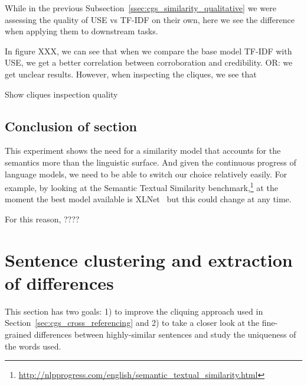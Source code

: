 While in the previous Subsection~\ref{ssec:cgs_similarity_qualitative} we were assessing the quality of USE vs TF-IDF on their own, here we see the difference when applying them to downstream tasks.


In figure XXX, we can see that when we compare the base model TF-IDF with USE, we get a better correlation between corroboration and credibility.
OR: we get unclear results. However, when inspecting the cliques, we see that 


Show cliques inspection quality


\subsection{Conclusion of section}
\label{ssec:cgs_similarity_conclusion}

This experiment shows the need for a similarity model that accounts for the semantics more than the linguistic surface. And given the continuous progress of language models, we need to be able to switch our choice relatively easily.
For example, by looking at the Semantic Textual Similarity benchmark,\footnote{\url{http://nlpprogress.com/english/semantic_textual_similarity.html}} at the moment the best model available is XLNet~\citep{yang2019xlnet} but this could change at any time.

For this reason, ????



\section{Sentence clustering and extraction of differences}
\label{sec:cgs_clustering_and_differences}
This section has two goals: 1) to improve the cliquing approach used in Section~\ref{sec:cgs_cross_referencing} and 2) to take a closer look at the fine-grained differences between highly-similar sentences and study the uniqueness of the words used.

